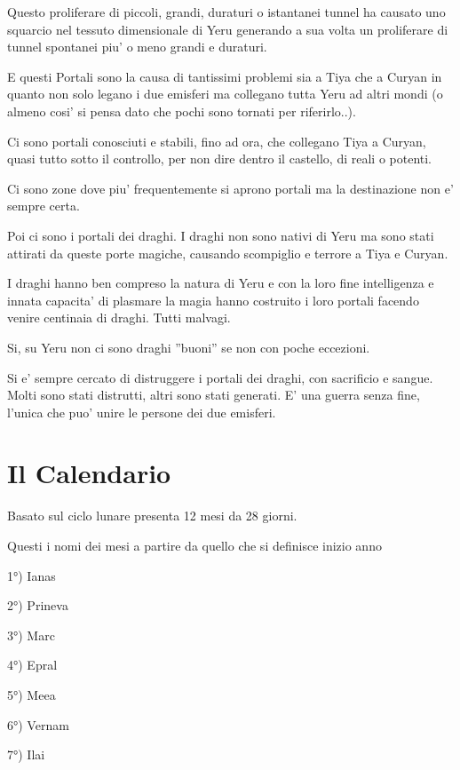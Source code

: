 \documentclass[a4paper,11pt,twoside,openany]{book}
\begin{document}
{Questo proliferare di piccoli, grandi, duraturi o istantanei tunnel ha causato uno squarcio nel tessuto dimensionale di Yeru generando a sua volta un proliferare di tunnel spontanei piu' o meno grandi e duraturi.

E questi Portali sono la causa di tantissimi problemi sia a Tiya che a Curyan in quanto non solo legano i due emisferi ma collegano tutta Yeru ad altri mondi (o almeno cosi' si pensa dato che pochi sono tornati per riferirlo..).

Ci sono portali conosciuti e stabili, fino ad ora, che collegano Tiya a Curyan, quasi tutto sotto il controllo, per non dire dentro il castello, di reali o potenti.

Ci sono zone dove piu' frequentemente si aprono portali ma la destinazione non e' sempre certa.

Poi ci sono i portali dei draghi. I draghi non sono nativi di Yeru ma sono stati attirati da queste porte magiche, causando scompiglio e terrore a Tiya e Curyan.

I draghi hanno ben compreso la natura di Yeru e con la loro fine intelligenza e innata capacita' di plasmare la magia hanno costruito i loro portali facendo venire centinaia di draghi. Tutti malvagi.

Si, su Yeru non ci sono draghi ''buoni'' se non con poche eccezioni.

Si e' sempre cercato di distruggere i portali dei draghi, con sacrificio e sangue. Molti sono stati distrutti, altri sono stati generati. E' una guerra senza fine, l'unica che puo' unire le persone dei due emisferi. 

\pagebreak

\section{Il Calendario}

\label{il-calendario}

Basato sul ciclo lunare presenta 12 mesi da 28 giorni.

Questi i nomi dei mesi a partire da quello che si definisce inizio
anno
\bigskip

1°) Ianas

2°) Prineva

3°) Marc

4°) Epral

5°) Meea

6°) Vernam

7°) Ilai

}
\end{document}
